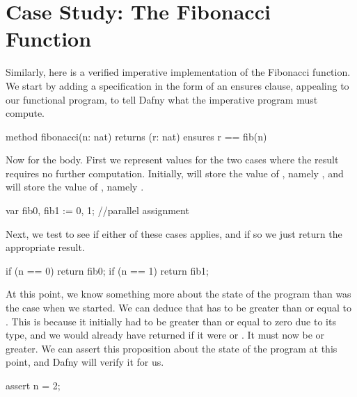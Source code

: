 \documentclass[letterpaper,10pt,english]{sphinxmanual}
\begin{document}
\section{Case Study: The Fibonacci Function}
\label{\detokenize{05-putting-it-together:case-study-the-fibonacci-function}}
Similarly, here is a verified imperative implementation of the
Fibonacci function. We start by adding a specification in the
form of an ensures clause, appealing to our functional program,
to tell Dafny what the imperative program must compute.

\begin{sphinxVerbatim}[commandchars=\\\{\}]
method fibonacci(n: nat) returns (r: nat)
    ensures r == fib(n)
\end{sphinxVerbatim}

Now for the body. First we represent values for the two cases where
the result requires no further computation.  Initially,  will
store the value of , namely , and  will store the
value of , namely .

\begin{sphinxVerbatim}[commandchars=\\\{\}]
var fib0, fib1 := 0, 1; //parallel assignment
\end{sphinxVerbatim}

Next, we test to see if either of these cases applies,
and if so we just return the appropriate result.

\begin{sphinxVerbatim}[commandchars=\\\{\}]
if (n == 0) \PYGZob{} return fib0; \PYGZcb{}
if (n == 1) \PYGZob{} return fib1; \PYGZcb{}
\end{sphinxVerbatim}

At this point, we know something more about the state of the program
than was the case when we started. We can deduce that  has to be
greater than or equal to . This is because it initially had to be
greater than or equal to zero due to its type, and we would already
have returned if it were  or . It must now be  or greater. We
can assert this proposition about the state of the program at this
point, and Dafny will verify it for us.

\begin{sphinxVerbatim}[commandchars=\\\{\}]
assert n \PYGZgt{}= 2;
\end{sphinxVerbatim}
\end{document}
